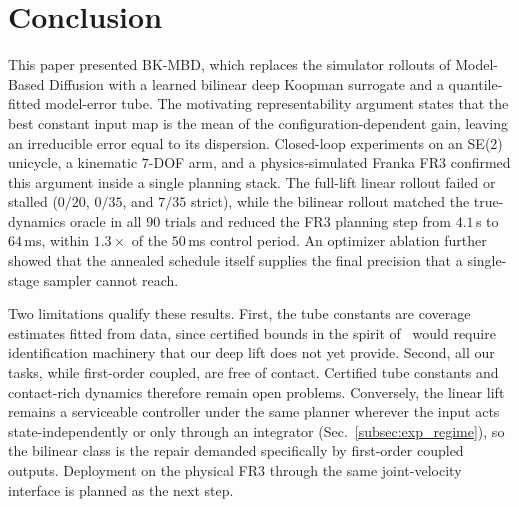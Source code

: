 \documentclass[lettersize,journal]{IEEEtran}
\theoremstyle{remark}
\newcommand{\bkmbd}{\textsc{BK-MBD}}
\begin{document}
\section{Conclusion}\label{sec:conclusion}
This paper presented \bkmbd{}, which replaces the simulator rollouts of
Model-Based Diffusion with a learned bilinear deep Koopman surrogate and
a quantile-fitted model-error tube. The motivating representability
argument states that the best constant input map is the mean of the
configuration-dependent gain, leaving an irreducible error equal to its
dispersion. Closed-loop experiments on an SE(2) unicycle, a kinematic
$7$-DOF arm, and a physics-simulated Franka FR3 confirmed this argument
inside a single planning stack. The full-lift linear rollout failed or
stalled ($0/20$, $0/35$, and $7/35$ strict), while the bilinear rollout
matched the true-dynamics oracle in all $90$ trials and reduced the FR3
planning step from $4.1$\,s to $64$\,ms, within $1.3\times$ of the
$50$\,ms control period. An optimizer ablation further showed that the
annealed schedule itself supplies the final precision that a
single-stage sampler cannot reach.

Two limitations qualify these results. First, the tube constants are
coverage estimates fitted from data, since certified bounds in the
spirit of~\cite{safedmd2024} would require identification machinery
that our deep lift does not yet provide. Second, all our tasks, while
first-order coupled, are free of contact. Certified tube constants and
contact-rich dynamics therefore remain open problems. Conversely, the
linear lift remains a serviceable controller under the same planner
wherever the input acts state-independently or only through an
integrator (Sec.~\ref{subsec:exp_regime}), so the bilinear class is
the repair demanded specifically by first-order coupled outputs.
Deployment on the physical FR3 through the same joint-velocity
interface is planned as the next step.



\end{document}
